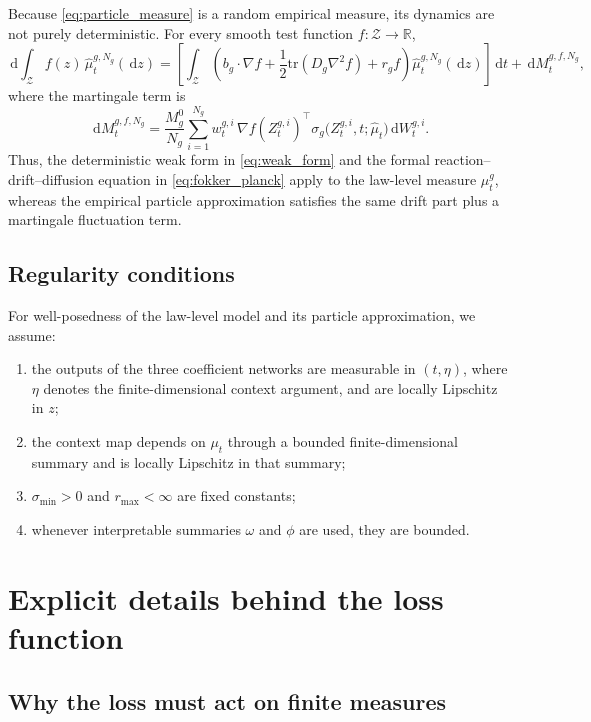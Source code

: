 \documentclass[11pt]{article}
\newcommand{\R}{\mathbb{R}}
\newcommand{\dd}{\,\mathrm{d}}
\newcommand{\tr}{\mathrm{tr}}
\newcommand{\Zcal}{\mathcal{Z}}
\begin{document}
Because \cref{eq:particle_measure} is a random empirical measure, its dynamics are not purely deterministic. For every smooth test function $f:\Zcal\to\R$,
\begin{equation}
\dd \int_{\Zcal} f(z)\,\hat\mu_t^{g,N_g}(\dd z)
=
\left[
\int_{\Zcal}
\left(
 b_g\cdot \nabla f
 +
 \frac{1}{2}\tr(D_g\nabla^2 f)
 +
 r_g f
\right)
\hat\mu_t^{g,N_g}(\dd z)
\right]\dd t
+
\dd M_t^{g,f,N_g},
\label{eq:empirical_weak_form}
\end{equation}
where the martingale term is
\begin{equation}
\dd M_t^{g,f,N_g}
=
\frac{M_g^0}{N_g}
\sum_{i=1}^{N_g}
w_t^{g,i}\,\nabla f\!\left(Z_t^{g,i}\right)^\top
\sigma_g\big(Z_t^{g,i},t;\hat\mu_t\big)
\dd W_t^{g,i}.
\label{eq:martingale_term}
\end{equation}
Thus, the deterministic weak form in \cref{eq:weak_form} and the formal reaction--drift--diffusion equation in \cref{eq:fokker_planck} apply to the law-level measure $\mu_t^g$, whereas the empirical particle approximation satisfies the same drift part plus a martingale fluctuation term.

\subsection{Regularity conditions}

For well-posedness of the law-level model and its particle approximation, we assume:
\begin{enumerate}[label=(R\arabic*),leftmargin=2.8em]
    \item the outputs of the three coefficient networks are measurable in $(t,\eta)$, where $\eta$ denotes the finite-dimensional context argument, and are locally Lipschitz in $z$;
    \item the context map depends on $\mu_t$ through a bounded finite-dimensional summary and is locally Lipschitz in that summary;
    \item $\sigma_{\min}>0$ and $r_{\max}<\infty$ are fixed constants;
    \item whenever interpretable summaries $\omega$ and $\phi$ are used, they are bounded.
\end{enumerate}

\section{Explicit details behind the loss function}

\subsection{Why the loss must act on finite measures}
\end{document}
